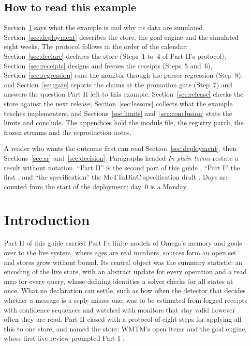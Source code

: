 \documentclass[11pt]{article}
\theoremstyle{definition}
\theoremstyle{plain}
\begin{document}
\subsection*{How to read this example}
Section~\ref{sec:intro} says what the example is and why its data are simulated.
Section~\ref{sec:deployment} describes the store, the goal engine and the simulated eight weeks.
The protocol follows in the order of the calendar: Section~\ref{sec:declare} declares the store
(Steps~1 to~4 of Part II's protocol), Section~\ref{sec:receipts} designs and freezes the receipts
(Steps~5 and~6), Section~\ref{sec:regression} runs the monitor through the parser regression
(Step~8), and Section~\ref{sec:gate} reports the claims at the promotion gate (Step~7) and answers
the question Part II left to this example. Section~\ref{sec:release} checks the store against the
next release, Section~\ref{sec:lessons} collects what the example teaches implementers, and
Sections~\ref{sec:limits} and~\ref{sec:conclusion} state the limits and conclude. The appendices
hold the module file, the registry patch, the frozen streams and the reproduction notes.

A reader who wants the outcome first can read Section~\ref{sec:deployment}, then
Sections~\ref{sec:sr} and~\ref{sec:decision}. Paragraphs headed \emph{In plain terms} restate a
result without notation. ``Part II'' is the second part of this guide \cite{part2}, ``Part I'' the
first \cite{part1}, and ``the specification'' the MeTTaDinC specification draft \cite{spec}. Days are
counted from the start of the deployment; day~$0$ is a Monday.

\clearpage
{\setlength{\parskip}{0pt}\tableofcontents}
\clearpage
\section{Introduction}\label{sec:intro}

Part II of this guide carried Part I's finite models of Omega's memory and goals over to the live
system, where ages are real numbers, sources form an open set and stores grow without bound. Its
central object was the summary statistic: an encoding of the live state, with an abstract update
for every operation and a read map for every query, whose defining identities a solver checks for
all states at once. What no declaration can settle, such as how often the detector that decides
whether a message is a reply misses one, was to be estimated from logged receipts with confidence
sequences and watched with monitors that stay valid however often they are read. Part II closed
with a protocol of eight steps for applying all this to one store, and named the store: WMTM's open
items and the goal engine, whose first live review prompted Part I \cite[Section~9]{part2}.
\end{document}
